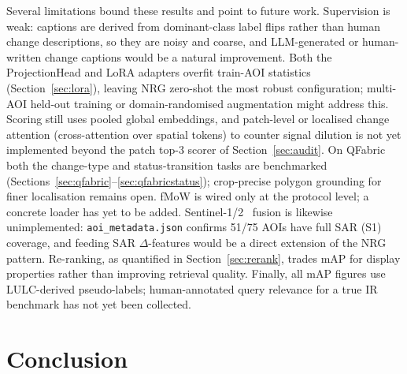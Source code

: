 \documentclass{article}
\begin{document}
Several limitations bound these results and point to future work. Supervision is
weak: captions are derived from dominant-class label flips rather than human
change descriptions, so they are noisy and coarse, and LLM-generated or
human-written change captions would be a natural improvement. Both the
ProjectionHead and LoRA adapters overfit train-AOI statistics
(Section~\ref{sec:lora}), leaving NRG zero-shot the most robust configuration;
multi-AOI held-out training or domain-randomised augmentation might address this.
Scoring still uses pooled global embeddings, and patch-level or localised change
attention (cross-attention over spatial tokens) to counter signal dilution is not
yet implemented beyond the patch top-3 scorer of Section~\ref{sec:audit}. On
QFabric both the change-type and status-transition tasks are benchmarked
(Sections~\ref{sec:qfabric}--\ref{sec:qfabricstatus}); crop-precise polygon
grounding for finer localisation remains open. fMoW is wired only at the protocol level; a
concrete loader has yet to be added. Sentinel-1/2~\cite{sentinel2} fusion is likewise
unimplemented: \texttt{aoi\_metadata.json} confirms 51/75 AOIs have full SAR (S1)
coverage, and feeding SAR $\Delta$-features would be a direct extension of the
NRG pattern. Re-ranking, as quantified in Section~\ref{sec:rerank}, trades mAP for
display properties rather than improving retrieval quality. Finally, all mAP
figures use LULC-derived pseudo-labels; human-annotated query relevance for a true
IR benchmark has not yet been collected.


\section{Conclusion}
\label{sec:conclusion}
\end{document}
